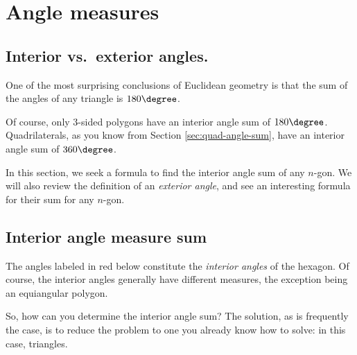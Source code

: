 \begin{exercises}
\end{exercises}

			\section{Angle measures}
			\label{sec:regular-polygon-angles}

\subsection{Interior vs.\ exterior angles.}

One of the most surprising conclusions of Euclidean geometry
is that the sum of the angles of any triangle is $180\degree$.

Of course, only 3-sided polygons have an interior angle sum of $180\degree$.
Quadrilaterals, as you know from Section \ref{sec:quad-angle-sum}, 
have an interior angle sum of $360\degree$.

In this section, we seek a formula to find the interior angle sum of any $n$-gon.
We will also review the definition of an \emph{exterior angle}, 
and see an interesting formula for their sum for any $n$-gon.

\subsection{Interior angle measure sum}

The angles labeled in red below constitute the \emph{interior angles} of the hexagon.
Of course, the interior angles generally have different measures, the exception being an equiangular polygon.
	\begin{center}
	\end{center}
So, how can you determine the interior angle sum? 
The solution, as is frequently the case, is to reduce the problem
to one you already know how to solve: in this case, triangles.

